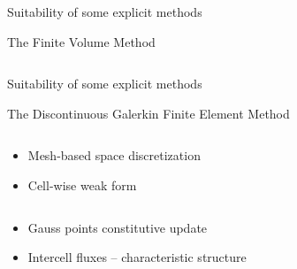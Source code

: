 \begin{frame}{Suitability of some explicit methods}
\begin{block}{The Finite Volume Method \cite{Leveque}}
\begin{overprint}
\begin{columns}
\begin{column}{0.48\textwidth}
        \end{column}
      \end{columns}
      \vspace{-0.2cm}
    \end{overprint}
  \end{block}
  
  
\end{frame}


\begin{frame}{Suitability of some explicit methods}
  \begin{block}{The Discontinuous Galerkin Finite Element Method \cite{Cockburn}}
    \vspace{-0.2cm}
    \begin{overprint}
      \vspace{-0.2cm}
      \begin{columns}
        \begin{footnotesize}
          \begin{column}{0.4\textwidth}
            \begin{itemize}
            \item[] Mesh-based space discretization
            \item[] Cell-wise weak form \cite{NeutronDG}
            \end{itemize}
          \end{column}
          \begin{column}{0.6\textwidth}
            \begin{itemize}
            \item[] Gauss points constitutive update
            \item[] Intercell fluxes -- characteristic structure
            \end{itemize}
          \end{column}
        \end{footnotesize}
      \end{columns}
      \vspace{3.65cm}
      \vspace{-0.2cm}
      \begin{columns}

\end{columns}
\end{overprint}
\end{block}
\end{frame}
